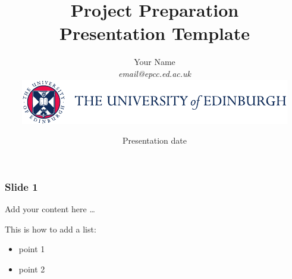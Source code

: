 \documentclass[xcolor=x11names,compress,usenames,dvipsnames,mathsans]{beamer}
\title[PP talk]{Project Preparation \\ Presentation Template}
\author[Name]{Your Name \\
\textit{email@epcc.ed.ac.uk} \\
\vspace{1em}
\includegraphics[scale=.8]{logo_colour.pdf}
} %
\date{Presentation date}
\begin{document}
\begin{frame}
\titlepage %
\end{frame}




\begin{frame}
\frametitle{Slide 1}
\vfill
Add your content here \ldots \\
\vfill

\pause
This is how to add a list:
\begin{itemize}
	\item point 1
	\item point 2
\end{itemize}

\vfill

\end{frame}
\end{document}
